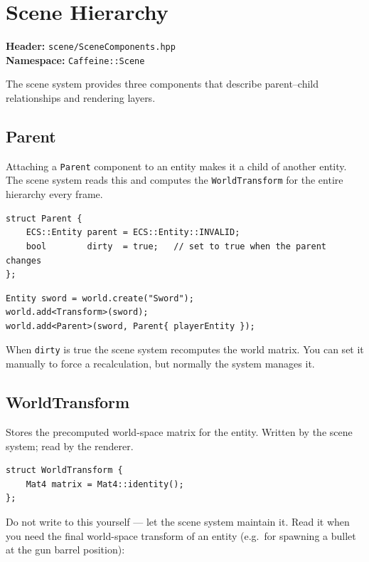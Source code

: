 \chapter{Scene Hierarchy}
\label{chap:scene}

\textbf{Header:} \texttt{scene/SceneComponents.hpp}\\
\textbf{Namespace:} \texttt{Caffeine::Scene}

The scene system provides three components that describe parent--child
relationships and rendering layers.

\section{Parent}

Attaching a \texttt{Parent} component to an entity makes it a child of
another entity. The scene system reads this and computes the
\texttt{WorldTransform} for the entire hierarchy every frame.

\begin{lstlisting}
struct Parent {
    ECS::Entity parent = ECS::Entity::INVALID;
    bool        dirty  = true;   // set to true when the parent changes
};
\end{lstlisting}

\begin{lstlisting}
Entity sword = world.create("Sword");
world.add<Transform>(sword);
world.add<Parent>(sword, Parent{ playerEntity });
\end{lstlisting}

When \texttt{dirty} is true the scene system recomputes the world matrix.
You can set it manually to force a recalculation, but normally the system
manages it.

\section{WorldTransform}

Stores the precomputed world-space matrix for the entity. Written by the
scene system; read by the renderer.

\begin{lstlisting}
struct WorldTransform {
    Mat4 matrix = Mat4::identity();
};
\end{lstlisting}

Do not write to this yourself — let the scene system maintain it. Read it
when you need the final world-space transform of an entity (e.g.\ for
spawning a bullet at the gun barrel position):

